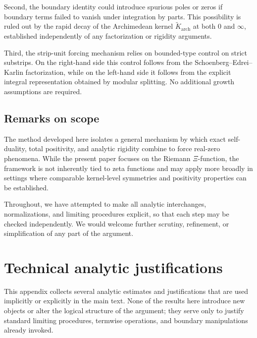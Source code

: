 \documentclass[11pt]{amsart}
\theoremstyle{definition}
\theoremstyle{remark}
\begin{document}
Second, the boundary identity could introduce spurious poles or zeros if boundary terms failed
to vanish under integration by parts. This possibility is ruled out by the rapid decay of the
Archimedean kernel $\widetilde K_{\mathrm{arch}}$ at both $0$ and $\infty$, established
independently of any factorization or rigidity arguments.

Third, the strip-unit forcing mechanism relies on bounded-type control on strict substrips.
On the right-hand side this control follows from the Schoenberg--Edrei--Karlin factorization,
while on the left-hand side it follows from the explicit integral representation obtained by
modular splitting. No additional growth assumptions are required.

\subsection{Remarks on scope}

The method developed here isolates a general mechanism by which exact self-duality, total
positivity, and analytic rigidity combine to force real-zero phenomena. While the present
paper focuses on the Riemann $\Xi$-function, the framework is not inherently tied to zeta
functions and may apply more broadly in settings where comparable kernel-level symmetries and
positivity properties can be established.

Throughout, we have attempted to make all analytic interchanges, normalizations, and limiting
procedures explicit, so that each step may be checked independently. We would welcome further
scrutiny, refinement, or simplification of any part of the argument.






\appendix

\section{Technical analytic justifications}
\label{app:technical}

This appendix collects several analytic estimates and justifications that are
used implicitly or explicitly in the main text. None of the results here
introduce new objects or alter the logical structure of the argument; they serve
only to justify standard limiting procedures, termwise operations, and boundary
manipulations already invoked.
\end{document}
